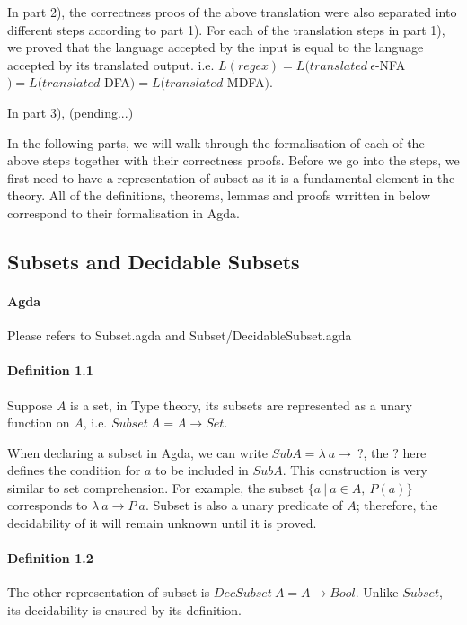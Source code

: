 \documentclass[twoside,openright,final]{bhamthesis}
\begin{document}
\par In part 2), the correctness proos of the above
translation were also separated into different steps according to part
1). For each of the translation steps in part 1), we proved
that the language accepted by the input is equal to the language
accepted by its translated output. i.e. \(L(regex) =
L(translated\ \epsilon\)-NFA\() = L(translated\) DFA\() =
L(translated\) MDFA\()\). 

\par In part 3), (pending...)

\par In the following parts, we will walk through the formalisation of
each of the above steps together with their correctness proofs. Before we go into the steps, we first need to have a
representation of subset as it is a fundamental element in the
theory. All of the definitions, theorems, lemmas and proofs wrritten in below
correspond to their formalisation in Agda.

\subsection{Subsets and Decidable Subsets}
\paragraph{Agda} Please refers to Subset.agda and Subset/DecidableSubset.agda

\paragraph{Definition 1.1} Suppose \(A\) is a set, in Type theory, its
subsets are represented as a unary function on
\(A\), i.e. \(Subset\ A = A \to Set\). \\

\par When declaring a subset in Agda, we can write \(SubA =
\lambda\ a \to\ ?\), the \(?\) here defines the
condition for \(a\) to be included in \(SubA\). This construction is
very similar to set comprehension. For example, the subset 
\(\{a\ | \ a \in A,\ P(a)\}\) corresponds to \(\lambda\ a \to P\
a\). Subset is also a unary predicate of \(A\); therefore, the decidability of it will remain
unknown until it is proved. 

\paragraph{Definition 1.2} The other representation of subset is \(DecSubset\ A = A \to
Bool\). Unlike \(Subset\), its decidability is ensured by its
definition. \\
\end{document}
